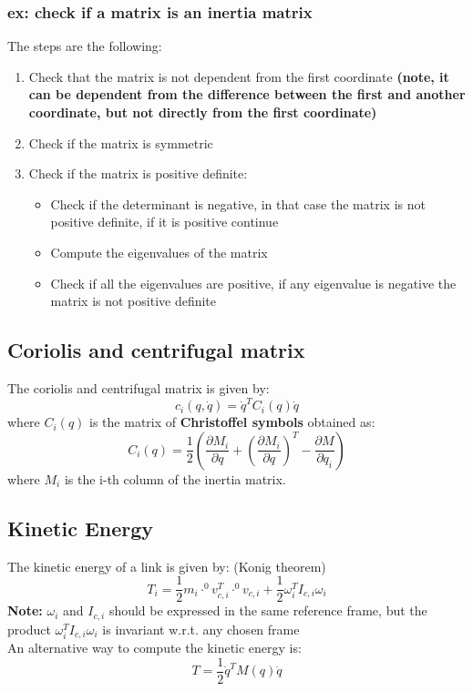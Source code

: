 \documentclass[a4paper,12pt]{article}
\begin{document}
\subsubsection{ex: check if a matrix is an inertia matrix}
The steps are the following:
\begin{enumerate}
    \item Check that the matrix is not dependent from the first coordinate \textbf{(note, it can be dependent from the 
    difference between the first and another coordinate, but not directly from the first coordinate)}
    \item Check if the matrix is symmetric
    \item Check if the matrix is positive definite: \begin{itemize}
        \item Check if the determinant is negative, in that case the 
        matrix is not positive definite, if it is positive continue
        \item Compute the eigenvalues of the matrix
        \item Check if all the eigenvalues are positive, if any eigenvalue is negative the 
        matrix is not positive definite
    \end{itemize}
    
\end{enumerate}

\subsection{Coriolis and centrifugal matrix} \label{sec:Coriolis and centrifugal matrix}
The coriolis and centrifugal matrix is given by:\begin{equation}
    c_i(q, \dot{q}) = \dot{q}^T C_i(q) \dot{q}
\end{equation}
where $C_i(q)$ is the matrix of \textbf{Christoffel symbols} obtained as:
\begin{equation}
    C_i(q) = \frac{1}{2}  \left( \frac{\partial M_{i}}{\partial q} + (\frac{\partial M_{i}}{\partial q})^T - \frac{\partial M}{\partial q_i} \right)
\end{equation}
where $M_i$ is the i-th column of the inertia matrix.


\subsection{Kinetic Energy}\label{sec:Kinetic Energy}
The kinetic energy of a link is given by: (Konig theorem)
\begin{equation}
    T_i = \frac{1}{2} m_i\cdot^0v_{c,i}^T\cdot^0v_{c,i} + \frac{1}{2} \omega_i^T I_{c,i} \omega_i
\end{equation}
\textbf{Note:} $\omega_i$ and $I_{c,i}$ should be expressed in the same reference frame,
but the product $\omega_i^T I_{c,i} \omega_i$ is invariant w.r.t. any chosen frame\\
An alternative way to compute the kinetic energy is:
\begin{equation}
    T = \frac{1}{2} \dot{q}^T M(q) \dot{q}
\end{equation}
\end{document}
